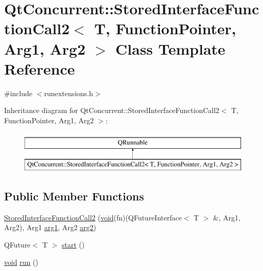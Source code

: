 \hypertarget{class_qt_concurrent_1_1_stored_interface_function_call2}{\section{Qt\-Concurrent\-:\-:Stored\-Interface\-Function\-Call2$<$ T, Function\-Pointer, Arg1, Arg2 $>$ Class Template Reference}
\label{class_qt_concurrent_1_1_stored_interface_function_call2}
}


{\ttfamily \#include $<$runextensions.\-h$>$}

Inheritance diagram for Qt\-Concurrent\-:\-:Stored\-Interface\-Function\-Call2$<$ T, Function\-Pointer, Arg1, Arg2 $>$\-:\begin{figure}[H]
\begin{center}
\leavevmode
\includegraphics[height=2.000000cm]{class_qt_concurrent_1_1_stored_interface_function_call2}
\end{center}
\end{figure}
\subsection*{Public Member Functions}
\begin{DoxyCompactItemize}
\item 
\hyperlink{class_qt_concurrent_1_1_stored_interface_function_call2_abaffb8e88612a15facf44c133fe5bd27}{Stored\-Interface\-Function\-Call2} (\hyperlink{group___u_a_v_objects_plugin_ga444cf2ff3f0ecbe028adce838d373f5c}{void}(fn)(Q\-Future\-Interface$<$ T $>$ \&, Arg1, Arg2), Arg1 \hyperlink{glext_8h_a4b247ab422408c1761a36f9034c2585b}{arg1}, Arg2 \hyperlink{glext_8h_a5aee5a44bf92a9837fea48e41ef0df57}{arg2})
\item 
Q\-Future$<$ T $>$ \hyperlink{class_qt_concurrent_1_1_stored_interface_function_call2_a4862bd98bba7a867b5f4b3c2d333deb7}{start} ()
\item 
\hyperlink{group___u_a_v_objects_plugin_ga444cf2ff3f0ecbe028adce838d373f5c}{void} \hyperlink{class_qt_concurrent_1_1_stored_interface_function_call2_a2f9ed8e39b5b388b6752ce436d4e2c81}{run} ()
\end{DoxyCompactItemize}


